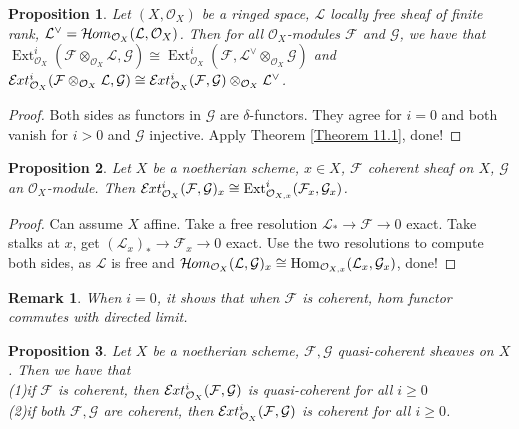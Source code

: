\documentclass{ctexart}
\newtheorem{remark}{Remark}[section]
\newtheorem{proposition}{Proposition}[section]
\renewcommand{\hom}{\operatorname{Hom}}
\newcommand{\ext}{\operatorname{Ext}}
\newcommand{\sheafhom}{\mathcal{H}\kern -.5pt om}
\newcommand{\sheafext}{\mathcal{E}\kern -.5pt xt}
\begin{document}
\begin{proposition}
    Let $(X, \mathcal{O}_{X})$ be a ringed space, $\mathcal{L}$ locally free sheaf of finite rank, $\mathcal{L}^{\lor} = \sheafhom_{\mathcal{O}_{X}}(\mathcal{L}, \mathcal{O}_{X})$.
    Then for all $\mathcal{O}_{X}$-modules $\mathcal{F}$ and $\mathcal{G}$,
    we have that $\ext_{\mathcal{O}_{X}}^{i}(\mathcal{F} \otimes_{\mathcal{O}_{X}} \mathcal{L}, \mathcal{G}) \cong \ext_{\mathcal{O}_{X}}^{i}(\mathcal{F}, \mathcal{L}^{\lor} \otimes_{\mathcal{O}_{X}} \mathcal{G})$ and $\sheafext_{\mathcal{O}_{X}}^{i}(\mathcal{F} \otimes_{\mathcal{O}_{X}} \mathcal{L}, \mathcal{G}) \cong \sheafext_{\mathcal{O}_{X}}^{i}(\mathcal{F}, \mathcal{G}) \otimes_{\mathcal{O}_{X}} \mathcal{L}^{\lor}$.
    \label{Proposition 11.4}
\end{proposition}
\begin{proof}
    Both sides as functors in $\mathcal{G}$ are $\delta$-functors.
    They agree for $i = 0$ and both vanish for $i > 0$ and $\mathcal{G}$ injective.
    Apply Theorem \ref{Theorem 11.1}, done!
\end{proof}
\begin{proposition}
    Let $X$ be a noetherian scheme, $x\in X$, $\mathcal{F}$ coherent sheaf on $X$, $\mathcal{G}$ an $\mathcal{O}_{X}$-module.
    Then $\sheafext_{\mathcal{O}_{X}}^{i}(\mathcal{F}, \mathcal{G})_{x} \cong \ext_{\mathcal{O}_{X, x}}^{i}(\mathcal{F}_{x}, \mathcal{G}_{x})$.
    \label{Proposition 11.5} 
\end{proposition}
\begin{proof}
    Can assume $X$ affine.
    Take a free resolution $\mathcal{L}_{\ast} \longrightarrow \mathcal{F} \longrightarrow 0$ exact.
    Take stalks at $x$, get $(\mathcal{L}_{x})_{\ast} \longrightarrow \mathcal{F}_{x} \longrightarrow 0$ exact.
    Use the two resolutions to compute both sides, as $\mathcal{L}$ is free and $\sheafhom_{\mathcal{O}_{X}}(\mathcal{L}, \mathcal{G})_{x} \cong \hom_{\mathcal{O}_{X, x}}(\mathcal{L}_{x}, \mathcal{G}_{x})$, done! 
\end{proof}
\begin{remark}
    When $i = 0$, it shows that when $\mathcal{F}$ is coherent, hom functor commutes with directed limit.
\end{remark}
\begin{proposition}
    Let $X$ be a noetherian scheme, $\mathcal{F}, \mathcal{G}$ quasi-coherent sheaves on $X$.
    Then we have that \\
    (1)if $\mathcal{F}$ is coherent, then $\sheafext_{\mathcal{O}_{X}}^{i}(\mathcal{F}, \mathcal{G})$ is quasi-coherent for all $i \ge 0$ \\
    (2)if both $\mathcal{F}, \mathcal{G}$ are coherent, then $\sheafext_{\mathcal{O}_{X}}^{i}(\mathcal{F}, \mathcal{G})$ is coherent for all $i \ge 0$.
    \label{Proposition 11.6}
\end{proposition}
\end{document}
